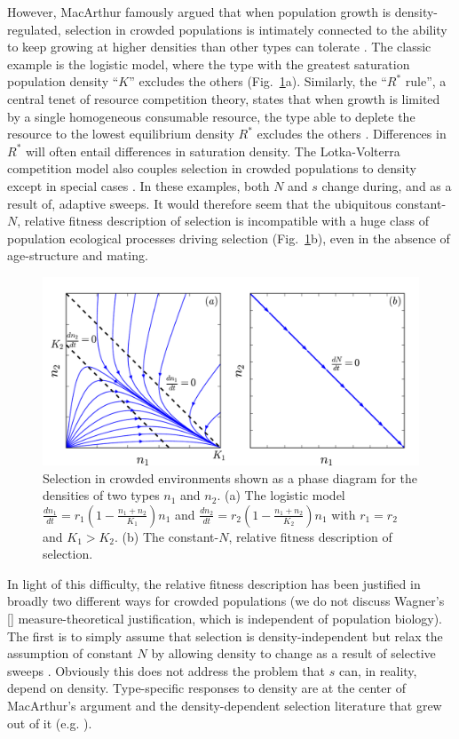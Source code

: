 \documentclass[12pt]{article}
\begin{document}
However, MacArthur famously argued that when population growth is density-regulated, selection in crowded populations is intimately connected to the ability to keep growing at higher densities than other types can tolerate \citep{macarthur_1967}. The classic example is the logistic model, where the type with the greatest saturation population density ``$K$'' excludes the others (Fig.~\ref{fig:Ksel}a). Similarly, the ``$R^*$ rule'', a central tenet of resource competition theory, states that when growth is limited by a single homogeneous consumable resource, the type able to deplete the resource to the lowest equilibrium density $R^*$ excludes the others \citep{grover_1997}. Differences in $R^*$ will often entail differences in saturation density. The Lotka-Volterra competition model also couples selection in crowded populations to density except in special cases \citep{smouse_1976,mallet_2012}. In these examples, both $N$ and $s$ change during, and as a result of, adaptive sweeps. It would therefore seem that the ubiquitous constant-$N$, relative fitness description of selection is incompatible with a huge class of population ecological processes driving selection (Fig.~\ref{fig:Ksel}b), even in the absence of age-structure and mating.

\begin{figure}
\centering
\includegraphics[scale=0.8]{Kplot.pdf}
\caption{\label{fig:Ksel} Selection in crowded environments shown as a phase diagram for the densities of two types $n_1$ and $n_2$. (a) The logistic model $\frac{dn_1}{dt}=r_1(1-\frac{n_1+n_2}{K_1})n_1$ and $\frac{dn_2}{dt}=r_2(1-\frac{n_1+n_2}{K_2})n_1$ with $r_1=r_2$ and $K_1>K_2$. (b) The constant-$N$, relative fitness description of selection.}
\end{figure}

In light of this difficulty, the relative fitness description has been justified in broadly two different ways for crowded populations (we do not discuss Wagner's [\citeyear{wagner_2010}] measure-theoretical justification, which is independent of population biology). The first is to simply assume that selection is density-independent but relax the assumption of constant $N$ by allowing density to change as a result of selective sweeps \citep[pp. 468]{barton_2007} \citep{prout_1980}. Obviously this does not address the problem that $s$ can, in reality, depend on density. Type-specific responses to density are at the center of MacArthur's argument and the density-dependent selection literature that grew out of it (e.g. \citep{roughgarden_1979}). 
\end{document}
